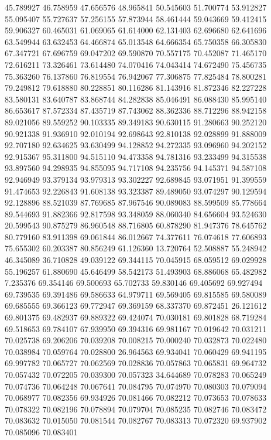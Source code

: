 45.789927
46.758959
47.656576
48.965841
50.545603
51.700774
53.912827
55.095407
55.727637
57.256155
57.873944
58.461444
59.043669
59.412415
59.906327
60.465031
61.069065
61.614000
62.131403
62.696680
62.641696
63.549944
63.632453
64.466874
65.013548
64.666354
65.750358
66.305830
67.347721
67.696759
69.047202
69.590870
70.557175
70.452087
71.465170
72.616211
73.326461
73.614480
74.070416
74.043414
74.672490
75.456735
75.363260
76.137860
76.819554
76.942067
77.306875
77.825484
78.800281
79.249812
79.618880
80.228851
80.116286
81.143916
81.872346
82.227228
83.580131
83.640787
83.868744
84.282838
85.046491
86.088430
85.995140
86.653617
87.572334
87.435719
87.743062
88.362336
88.712296
88.942158
89.021056
89.559252
90.103335
89.349183
90.630115
91.280663
90.252120
90.921338
91.936910
92.010194
92.698643
92.810138
92.028899
91.888009
92.707180
92.634625
93.630499
94.128852
94.272335
93.096960
94.202152
92.915367
95.311800
94.515110
94.473358
94.781316
93.233499
94.315538
93.897560
94.298935
94.855095
94.717108
94.235756
94.145371
94.587108
92.946949
93.379134
93.979313
93.302227
92.689845
93.071951
91.399559
91.474653
92.226843
91.608138
93.323387
89.489050
93.074297
90.129594
92.128896
88.521039
87.769685
87.967546
90.089083
88.599509
85.778664
89.544693
91.882366
92.817598
93.348059
88.060340
84.656604
93.524630
20.599543
90.875279
86.960548
88.716805
60.878290
81.947376
78.645762
80.779160
83.911398
69.061844
86.012667
74.377611
76.074618
77.606893
75.655302
60.203387
80.856249
61.126360
13.720764
52.508887
55.248942
46.345089
36.710828
49.039122
69.344115
70.045915
68.059512
69.029928
55.196257
61.880690
45.646499
58.542173
51.493903
68.886068
65.482982
7.235376
69.354146
69.500693
65.702733
59.830146
69.405692
69.927494
69.739535
69.391486
69.586633
64.979711
69.569405
69.815585
69.580089
69.685555
69.366123
69.772947
69.369159
68.337370
69.872451
26.121612
69.801375
69.482937
69.889322
69.424074
70.030181
69.801828
68.719284
69.518653
69.784107
67.939950
69.394316
69.981167
70.019642
70.031211
70.025738
69.206206
70.039208
70.008215
70.000240
70.032873
70.022480
70.038984
70.059764
70.028800
26.964563
69.934041
70.060429
69.941195
69.997782
70.065727
70.062569
70.028836
70.057863
70.065831
69.964732
70.057432
70.072205
70.039300
70.057323
34.644689
70.078283
70.065249
70.074736
70.064248
70.067641
70.084795
70.074970
70.080303
70.079094
70.068977
70.082356
69.934926
70.081466
70.082212
70.073653
70.078633
70.078322
70.082196
70.078894
70.079704
70.085235
70.082746
70.083472
70.083632
70.015050
70.081544
70.082767
70.083313
70.072320
69.937902
70.085096
70.083401
